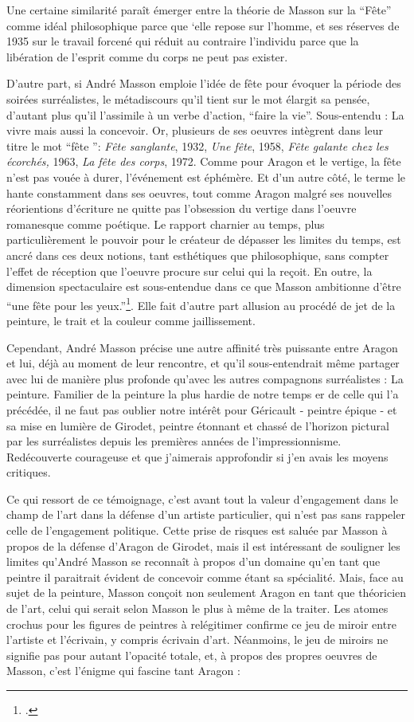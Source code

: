	Une certaine similarité paraît émerger entre la théorie de Masson sur la \enquote{Fête} comme idéal philosophique parce que ‘elle repose sur l’homme, et ses réserves de 1935 sur le travail forcené qui réduit au contraire l’individu parce que la libération de l’esprit comme du corps ne peut pas exister. 

	D’autre part, si André Masson emploie l'idée de fête pour évoquer la période des soirées surréalistes, le métadiscours qu’il tient sur le mot élargit sa pensée, d’autant plus qu’il l’assimile à un verbe d’action, \enquote{faire la vie}. Sous-entendu : La vivre mais aussi la concevoir. Or, plusieurs de ses oeuvres intègrent dans leur titre le mot \enquote{fête }: \emph{Fête sanglante}, 1932, \emph{Une fête}, 1958, \emph{Fête galante chez les écorchés,} 1963, \emph{La fête des corps}, 1972. Comme pour Aragon et le vertige, la fête n’est pas vouée à durer, l’événement est éphémère. Et d’un autre côté, le terme le hante constamment dans ses oeuvres, tout comme Aragon malgré ses nouvelles réorientions d’écriture ne quitte pas l’obsession du vertige dans l’oeuvre romanesque comme poétique. Le rapport charnier au temps, plus particulièrement le pouvoir pour le créateur de dépasser les limites du temps, est ancré dans ces deux notions, tant esthétiques que philosophique, sans compter l’effet de réception que l’oeuvre procure sur celui qui la reçoit. En outre, la dimension spectaculaire est sous-entendue dans ce que Masson ambitionne d’être \enquote{une fête pour les yeux.}\footcite{memoiremonde}. Elle fait d’autre part allusion au procédé de jet de la peinture, le trait et la couleur comme jaillissement. 

	Cependant, André Masson précise une autre affinité très puissante entre Aragon et lui, déjà au moment de leur rencontre, et qu’il sous-entendrait même partager avec lui de manière plus profonde qu’avec les autres compagnons surréalistes : La peinture. 
	Familier de la peinture la plus hardie de notre temps er de celle qui l’a précédée, il ne faut pas oublier notre intérêt pour Géricault - peintre épique - et sa mise en lumière de Girodet, peintre étonnant et chassé de l’horizon pictural par les surréalistes depuis les premières années de l’impressionnisme. Redécouverte  courageuse et que j’aimerais approfondir si j’en avais les moyens critiques.
	
	Ce qui ressort de ce témoignage, c’est avant tout la valeur d’engagement dans le champ de l’art dans la défense d’un artiste particulier, qui n’est pas sans rappeler celle de l’engagement politique. Cette prise de risques est saluée par Masson à propos de la défense d’Aragon de Girodet, mais il est intéressant de souligner les limites qu’André Masson se reconnaît à propos d’un domaine qu’en tant que peintre il paraitrait évident de concevoir comme étant sa spécialité. Mais, face au sujet de la peinture, Masson conçoit non seulement Aragon en tant que théoricien de l’art, celui qui serait selon Masson le plus à même de la traiter. Les atomes crochus pour les figures de peintres à relégitimer confirme ce jeu de miroir entre l’artiste et l’écrivain, y compris écrivain d’art. Néanmoins, le jeu de miroirs ne signifie pas pour autant l’opacité totale, et, à propos des propres oeuvres de Masson, c’est l’énigme qui fascine tant Aragon :


